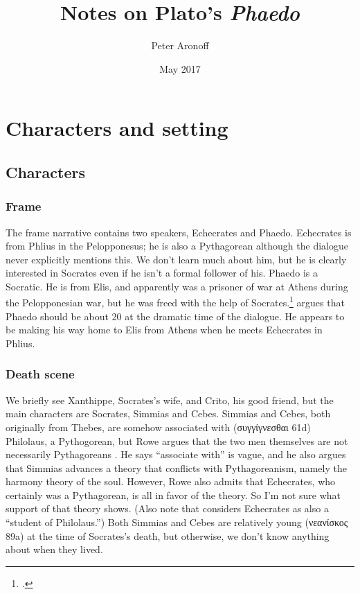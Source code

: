 \documentclass[12pt,letterpaper]{article}
\begin{document}
\begin{titlepage}
\title{Notes on Plato's \textit{Phaedo}}
\author{Peter Aronoff}
\date{May 2017}
\maketitle
\thispagestyle{empty}
\end{titlepage}

\section{Characters and setting}

\subsection{Characters}

\subsubsection{Frame}

The frame narrative contains two speakers, Echecrates and Phaedo. Echecrates is from Phlius in the Pelopponesus; he is also a Pythagorean although the dialogue never explicitly mentions this. We don't learn much about him, but he is clearly interested in Socrates even if he isn't a formal follower of his. Phaedo is a Socratic. He is from Elis, and apparently was a prisoner of war at Athens during the Pelopponesian war, but he was freed with the help of Socrates.\footcite[7]{rowe1993} \textcite[231]{nails2002} argues that Phaedo should be about 20 at the dramatic time of the dialogue. He appears to be making his way home to Elis from Athens when he meets Echecrates in Phlius.

\subsubsection{Death scene}

We briefly see Xanthippe, Socrates's wife, and Crito, his good friend, but the main characters are Socrates, Simmias and Cebes. Simmias and Cebes, both originally from Thebes, are somehow associated with (\textgreek{συγγίγνεσθαι} 61d) Philolaus, a Pythogorean, but Rowe argues that the two men themselves are not necessarily Pythagoreans \parencite[7]{rowe1993}. He says ``associate with'' is vague, and he also argues that Simmias advances a theory that conflicts with Pythagoreanism, namely the harmony theory of the soul. However, Rowe also admits that Echecrates, who certainly was a Pythagorean, is all in favor of the theory. So I'm not sure what support of that theory shows. (Also note that \textcite[138]{nails2002} considers Echecrates as also a ``student of Philolaus.'') Both Simmias and Cebes are relatively young (\textgreek{νεανίσκος} 89a) at the time of Socrates's death, but otherwise, we don't know anything about when they lived.
\end{document}
